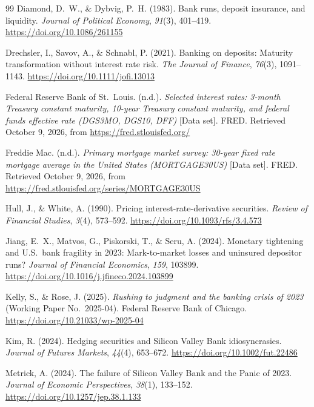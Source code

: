 \begin{thebibliography}{99}
Diamond, D.~W., \& Dybvig, P.~H. (1983). Bank runs, deposit insurance, and
liquidity. \textit{Journal of Political Economy}, \textit{91}(3), 401--419.
\url{https://doi.org/10.1086/261155}

Drechsler, I., Savov, A., \& Schnabl, P. (2021). Banking on deposits: Maturity
transformation without interest rate risk. \textit{The Journal of Finance},
\textit{76}(3), 1091--1143. \url{https://doi.org/10.1111/jofi.13013}

Federal Reserve Bank of St.\ Louis. (n.d.). \textit{Selected interest rates:
3-month Treasury constant maturity, 10-year Treasury constant maturity, and
federal funds effective rate (DGS3MO, DGS10, DFF)} [Data set]. FRED. Retrieved
October 9, 2026, from \url{https://fred.stlouisfed.org/}

Freddie Mac. (n.d.). \textit{Primary mortgage market survey: 30-year fixed rate
mortgage average in the United States (MORTGAGE30US)} [Data set]. FRED. Retrieved
October 9, 2026, from \url{https://fred.stlouisfed.org/series/MORTGAGE30US}

Hull, J., \& White, A. (1990). Pricing interest-rate-derivative securities.
\textit{Review of Financial Studies}, \textit{3}(4), 573--592.
\url{https://doi.org/10.1093/rfs/3.4.573}

Jiang, E.~X., Matvos, G., Piskorski, T., \& Seru, A. (2024). Monetary tightening
and U.S.\ bank fragility in 2023: Mark-to-market losses and uninsured depositor
runs? \textit{Journal of Financial Economics}, \textit{159}, 103899.
\url{https://doi.org/10.1016/j.jfineco.2024.103899}

Kelly, S., \& Rose, J. (2025). \textit{Rushing to judgment and the banking crisis of
2023} (Working Paper No.\ 2025-04). Federal Reserve Bank of Chicago.
\url{https://doi.org/10.21033/wp-2025-04}

Kim, R. (2024). Hedging securities and Silicon Valley Bank idiosyncrasies.
\textit{Journal of Futures Markets}, \textit{44}(4), 653--672.
\url{https://doi.org/10.1002/fut.22486}

Metrick, A. (2024). The failure of Silicon Valley Bank and the Panic of 2023.
\textit{Journal of Economic Perspectives}, \textit{38}(1), 133--152.
\url{https://doi.org/10.1257/jep.38.1.133}


\end{thebibliography}
